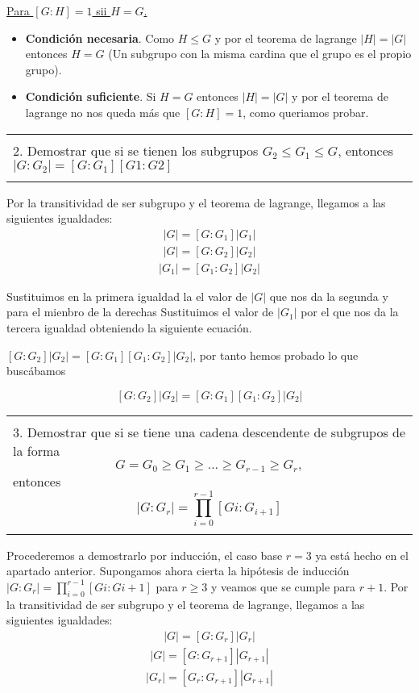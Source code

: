 \documentclass[12pt]{article}
\newenvironment{micaja}
{
    \begin{center}
    \begin{tabular}{|p{0.9\textwidth}|}
    \hline\\
    }   
    {   
    \\\\\hline
    \end{tabular} 
    \end{center}
    }
\begin{document}
    \underline{Para $[G:H]=1$ sii $H=G$.}
    \begin{itemize}
    \item \textbf{Condición necesaria}. Como  $H \leq G$ y por el teorema de lagrange $|H| = |G|$ entonces $H=G$ (Un subgrupo con la misma cardina que el grupo es el propio grupo).
    \item\textbf{Condición suficiente}. Si $H=G$ entonces $|H| = |G|$ y por el teorema de lagrange no nos queda más que $[G:H]=1$, 
    como queriamos probar. 
\end{itemize}   
    \begin{micaja}
    2. Demostrar que si se tienen los subgrupos $G_2 \leq G_1 \leq G$, entonces $|G:G_2| = [G:G_1][G1:G2]$
    \end{micaja}
Por la transitividad de ser subgrupo y el teorema de lagrange, llegamos a las siguientes igualdades:
    \begin{align}
        |G| = [G:G_1] |G_1|
    \end{align}
    \begin{align}
        |G| = [G:G_2] |G_2|
    \end{align}
    \begin{align}
        |G_1| = [G_1:G_2] |G_2|
    \end{align}

    Sustituimos en la primera igualdad la el valor de $|G|$ que nos da la segunda y para el mienbro de la derechas Sustituimos
    el valor de $|G_1|$ por el que nos da la tercera igualdad obteniendo la siguiente ecuación. 

    $[G:G_2] |G_2| = [G:G_1] [G_1:G_2] |G_2|$, por tanto hemos probado lo que buscábamos

    $$[G:G_2] |G_2| = [G:G_1] [G_1:G_2] |G_2|$$


    \begin{micaja}
        3. Demostrar que si se tiene una cadena descendente de subgrupos de la forma
        $$G=G_0 \geq G_1 \geq ...   \geq G_{r-1} \geq G_r,$$ 
        entonces 
        $$|G:G_r| = \prod_{i=0}^{r-1}[Gi:G_{i+1}]$$
    \end{micaja}

    Procederemos a demostrarlo por inducción, el caso base $r=3$ ya está hecho en el apartado anterior. 
    Supongamos ahora cierta la hipótesis de inducción $|G:G_r| = \prod_{i=0}^{r-1}[Gi:Gi+1]$ para $r \geq 3$ y veamos que se cumple para 
    $r+1$. 
    Por la transitividad de ser subgrupo y el teorema de lagrange, llegamos a las siguientes igualdades:
    \begin{align}
        |G| = [G:G_r] |G_r|
    \end{align}
    \begin{align}
        |G| = [G:G_{r+1}] |G_{r+1}|
    \end{align}
    \begin{align}
        |G_r| = [G_r:G_{r+1}] |G_{r+1}|
    \end{align}
\end{document}
